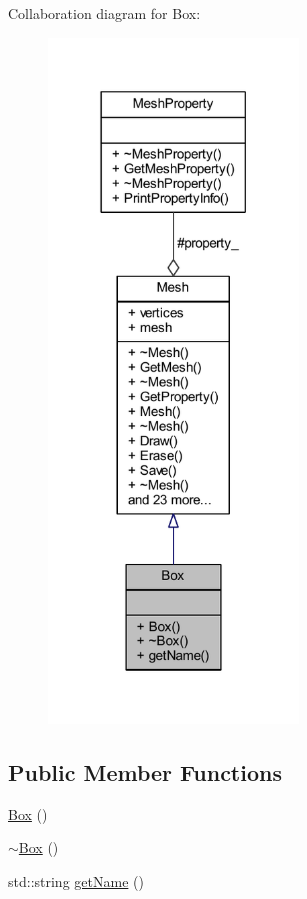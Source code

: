 Collaboration diagram for Box\+:\nopagebreak
\begin{figure}[H]
\begin{center}
\leavevmode
\includegraphics[width=188pt]{class_box__coll__graph}
\end{center}
\end{figure}
\subsection*{Public Member Functions}
\begin{DoxyCompactItemize}
\item 
\mbox{\hyperlink{class_box_aca78d7db44972bfa78d46b7bbc8796f6}{Box}} ()
\item 
\mbox{\hyperlink{class_box_a6a5e09398e85d602a046b429062fb9c2}{$\sim$\+Box}} ()
\item 
std\+::string \mbox{\hyperlink{class_box_ac8792393d053c6cac65a36e5c1f27f15}{get\+Name}} ()
\end{DoxyCompactItemize}
